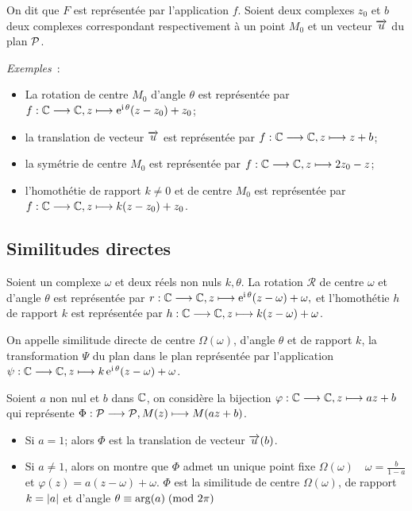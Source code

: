 On dit que \(F\) est représentée par l'application \(f\). Soient deux complexes 
\(z_0\) et \(b\) deux complexes correspondant respectivement à un point \(M_0\) 
et un vecteur \(\vect{u}\) du plan \(\P\).

\emph{Exemples}~:
\begin{itemize}
    \item La rotation de centre \(M_0\) d'angle \(\theta\) est représentée par 
        \(\fonctionL{f}{\C}{\C}{z}{\expc{}{\theta}(z-z_0)  + z_0}\);
    \item la translation de vecteur \(\vect{u}\) est représentée par 
        \(\fonctionL{f}{\C}{\C}{z}{z + b}\);
    \item la symétrie de centre \(M_0\) est représentée par 
        \(\fonctionL{f}{\C}{\C}{z}{2z_0-z}\);
    \item l'homothétie de rapport \(k\neq 0\) et de centre \(M_0\) est 
        représentée par \(\fonctionL{f}{\C}{\C}{z}{k(z-z_0) + z_0}\).
\end{itemize}

\subsection{Similitudes directes}
\label{subsec:simdirecte}

Soient un complexe \(\omega\) et deux réels non nuls \(k, \theta \). La rotation 
\(\mathcal{R}\) de centre \(\omega\) et d'angle \(\theta\) est représentée par 
\(\fonctionL{r}{\C}{\C}{z}{\expc{}{\theta}(z-\omega) + \omega},\) et 
l'homothétie \(h\) de rapport \(k\) est représentée par 
\(\fonctionL{h}{\C}{\C}{z}{k(z-\omega) + \omega}\).

\begin{defdef}
    On appelle similitude directe de centre \(\Omega(\omega)\), d'angle 
    \(\theta\) et de rapport \(k\), la transformation \(\Psi\) du plan 
    dans le plan représentée par l'application 
    \(\fonctionL{\psi}{\C}{\C}{z}{\expc{k}{\theta}(z-\omega) + \omega}\).
\end{defdef}
Soient \(a\) non nul et \(b\) dans \(\C\), on considère la bijection 
\(\fonctionL{\varphi}{\C}{\C}{z}{az + b}\) qui représente 
\(\fonctionL{\Phi}{\P}{\P}{M(z)}{M(az + b)}\).

\begin{itemize}
    \item Si \(a = 1\); alors  \(\Phi\) est la translation de vecteur 
        \(\vect{u}(b)\).
    \item Si \(a \neq 1\), alors on montre que \(\Phi\) admet un unique point 
        fixe \(\Omega(\omega) \quad \omega = \frac{b}{1-a}\) et \(\varphi(z) = 
        a(z-\omega) + \omega\).
        \(\Phi\) est la similitude de centre \(\Omega(\omega)\), de rapport \(k 
        = \abs{a}\) et d'angle \(\congru{\theta}{\arg(a)}{2\pi}\)
\end{itemize}

